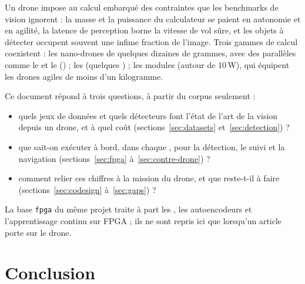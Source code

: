 \documentclass[11pt,a4paper]{article}
\begin{document}
Un drone impose au calcul embarqué des contraintes que les benchmarks de vision
ignorent : la masse et la puissance du calculateur se paient en autonomie et en
agilité, la latence de perception borne la vitesse de vol sûre, et les objets à détecter
occupent souvent une infime fraction de l'image. Trois gammes de calcul coexistent : les
nano-drones de quelques dizaines de grammes, avec des  parallèles comme le  et le  () ;
les   (quelques ) ; les modules  (autour de 10\,W), qui équipent les drones
agiles de moins d'un kilogramme.

Ce document répond à trois questions, à partir du corpus seulement :
\begin{itemize}
  \item quels jeux de données et quels détecteurs font l'état de l'art de la vision
    depuis un drone, et à quel coût (sections~\ref{sec:datasets} et~\ref{sec:detection}) ?
  \item que sait-on exécuter à bord, dans chaque , pour la détection,
    le suivi et la navigation (sections~\ref{sec:fpga} à~\ref{sec:contre-drone}) ?
  \item comment relier ces chiffres à la mission du drone, et que reste-t-il à faire
    (sections~\ref{sec:codesign} à~\ref{sec:gaps}) ?
\end{itemize}
La base \texttt{fpga} du même projet traite à part les , les autoencodeurs et
l'apprentissage continu sur FPGA ; ils ne sont repris ici que lorsqu'un article porte sur
le drone.












\section{Conclusion}
\end{document}
